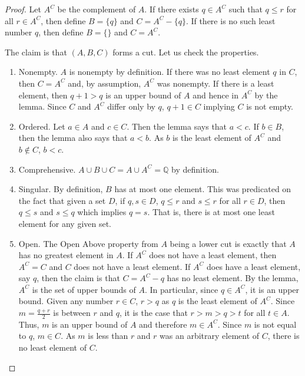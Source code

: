 \documentclass[12pt]{article}
\begin{document}
\begin{proof}
    Let $A^C$ be the complement of $A$. If there exists $q \in A^C$ such that $q \leq r$ for all $r \in A^C$, then define $B = \{q\}$ and $C = A^C - \{q\}$. If there is no such least number $q$, then define $B = \{\}$ and $C = A^C$. 

    The claim is that $(A, B, C)$ forms a cut. Let us check the properties. 

    \begin{enumerate}
        \item Nonempty. $A$ is nonempty by definition. If there was no least element $q$ in $C$, then $C = A^C$ and, by assumption, $A^C$ was nonempty. If there is a least element, then $q+1 > q$ is an upper bound of $A$ and hence in $A^C$ by the lemma. Since $C$ and $A^C$ differ only by $q$, $q+1 \in C$ implying $C$ is not empty. 
        \item Ordered. Let $a \in A$ and $c \in C$. Then the lemma says that $ a< c$. If $b \in B$, then the lemma also says that $a < b$. As $b$ is the least element of $A^C$ and $b \notin C$, $ b < c$. 
        \item Comprehensive. $A \cup B \cup C = A \cup A^C = \mathbb{Q}$ by definition. 
        \item Singular. By definition, $B$ has at most one element. This was predicated on the fact that given a set $D$, if $q, s \in D$, $q \leq r$ and $s \leq r$ for all $r \in D$, then $q \leq s$ and $s \leq q$ which implies $q = s$. That is, there is at most one least element for any given set. 
        \item Open. The Open Above property from $A$ being a lower cut is exactly that $A$ has no greatest element in $A$. If $A^C$ does not have a least element, then $A^C = C$ and $C$ does not have a least element. If $A^C$ does have a least element, say $q$, then the claim is that $C= A^C - {q}$ has no least element. By the lemma, $A^C$ is the set of upper bounds of $A$. In particular, since $q \in A^C$, it is an upper bound. Given any number $r \in C$, $r > q$ as $q$ is the least element of $A^C$. Since $m = \frac{q+r}{2}$ is between $r$ and $q$, it is the case that $r > m > q > t$ for all $t \in A$. Thus, $m$ is an upper bound of $A$ and therefore $m \in A^C$. Since $m$ is not equal to $q$, $m \in C$. As $m$ is less than $r$ and $r$ was an arbitrary element of $C$, there is no least element of $C$. 
    \end{enumerate}
\end{proof}
\end{document}
